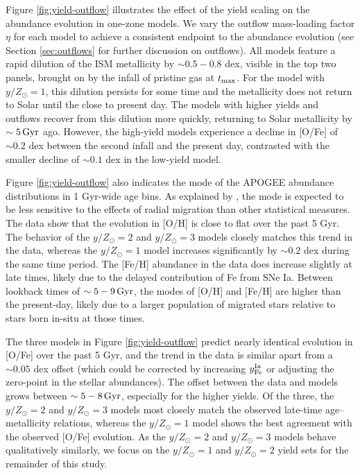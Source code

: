 \documentclass[twocolumn,twocolappendix,linenumbers]{aastex631}
\newcommand{\yZ}[1]{$y/Z_\odot=#1$}
\begin{document}
Figure \ref{fig:yield-outflow} illustrates the effect of the yield scaling on the abundance evolution in one-zone models. We vary the outflow mass-loading factor $\eta$ for each model to achieve a consistent endpoint to the abundance evolution (see Section \ref{sec:outflows} for further discussion on outflows). All models feature a rapid dilution of the ISM metallicity by $\sim0.5-0.8$ dex, visible in the top two panels, brought on by the infall of pristine gas at $t_{\rm max}$. For the model with $y/Z_\odot=1$, this dilution persists for some time and the metallicity does not return to Solar until the close to present day. The models with higher yields and outflows recover from this dilution more quickly, returning to Solar metallicity by $\sim5\,{\rm Gyr}$ ago. However, the high-yield models experience a decline in [O/Fe] of $\sim0.2$ dex between the second infall and the present day, contrasted with the smaller decline of $\sim0.1$ dex in the low-yield model.

Figure \ref{fig:yield-outflow} also indicates the mode of the APOGEE abundance distributions in 1 Gyr-wide age bins. As explained by \citet{johnson_milky_2024}, the mode is expected to be less sensitive to the effects of radial migration than other statistical measures. The data show that the evolution in [O/H] is close to flat over the past 5 Gyr. The behavior of the $y/Z_\odot=2$ and $y/Z_\odot=3$ models closely matches this trend in the data, whereas the $y/Z_\odot=1$ model increases significantly by $\sim0.2$ dex during the same time period. The [Fe/H] abundance in the data does increase slightly at late times, likely due to the delayed contribution of Fe from SNe Ia. Between lookback times of $\sim5-9\,{\rm Gyr}$, the modes of [O/H] and [Fe/H] are higher than the present-day, likely due to a larger population of migrated stars relative to stars born in-situ at those times. 

The three models in Figure \ref{fig:yield-outflow} predict nearly identical evolution in [O/Fe] over the past 5 Gyr, and the trend in the data is similar apart from a $\sim0.05$ dex offset (which could be corrected by increasing $y_{\rm Fe}^{\rm Ia}$ or adjusting the zero-point in the stellar abundances). The offset between the data and models grows between $\sim5-8\,{\rm Gyr}$, especially for the higher yields. Of the three, the \yZ{2} and \yZ{3} models most closely match the observed late-time age--metallicity relations, whereas the \yZ{1} model shows the best agreement with the observed [O/Fe] evolution. As the \yZ{2} and \yZ{3} models behave qualitatively similarly, we focus on the \yZ{1} and \yZ{2} yield sets for the remainder of this study.
\end{document}
